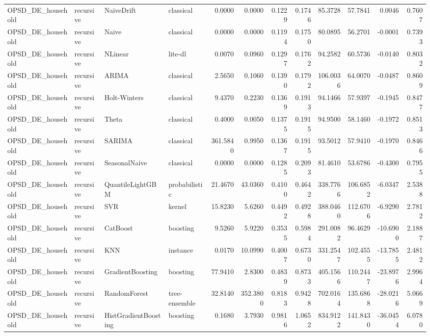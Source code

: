 \begin{tabular}{llllrrrrrrrr}
OPSD_DE_household & recursive & NaiveDrift & classical & 0.0000 & 0.0000 & 0.1229 & 0.1746 & 85.3728 & 57.7841 & 0.0046 & 0.7607 \\
OPSD_DE_household & recursive & Naive & classical & 0.0000 & 0.0000 & 0.1194 & 0.1750 & 80.0895 & 56.2701 & -0.0001 & 0.7393 \\
OPSD_DE_household & recursive & NLinear & lite-dl & 0.0070 & 0.0960 & 0.1297 & 0.1762 & 94.2582 & 60.5736 & -0.0140 & 0.8032 \\
OPSD_DE_household & recursive & ARIMA & classical & 2.5650 & 0.1060 & 0.1390 & 0.1792 & 106.0036 & 64.0070 & -0.0487 & 0.8609 \\
OPSD_DE_household & recursive & Holt-Winters & classical & 9.4370 & 0.2230 & 0.1369 & 0.1913 & 94.1466 & 57.9397 & -0.1945 & 0.8477 \\
OPSD_DE_household & recursive & Theta & classical & 0.4000 & 0.0050 & 0.1375 & 0.1915 & 94.9500 & 58.1460 & -0.1972 & 0.8513 \\
OPSD_DE_household & recursive & SARIMA & classical & 361.5840 & 0.9950 & 0.1367 & 0.1915 & 93.5012 & 57.9410 & -0.1970 & 0.8466 \\
OPSD_DE_household & recursive & SeasonalNaive & classical & 0.0000 & 0.0000 & 0.1285 & 0.2093 & 81.4610 & 53.6786 & -0.4300 & 0.7955 \\
OPSD_DE_household & recursive & QuantileLightGBM & probabilistic & 21.4670 & 43.0360 & 0.4100 & 0.4642 & 338.7766 & 106.6852 & -6.0347 & 2.5388 \\
OPSD_DE_household & recursive & SVR & kernel & 15.8230 & 5.6260 & 0.4492 & 0.4928 & 388.0460 & 112.6706 & -6.9290 & 2.7812 \\
OPSD_DE_household & recursive & CatBoost & boosting & 9.5260 & 5.9220 & 0.3535 & 0.5984 & 291.0082 & 96.4629 & -10.6900 & 2.1887 \\
OPSD_DE_household & recursive & KNN & instance & 0.0170 & 10.0990 & 0.4007 & 0.6730 & 331.2547 & 102.4555 & -13.7855 & 2.4812 \\
OPSD_DE_household & recursive & GradientBoosting & boosting & 77.9410 & 2.8300 & 0.4839 & 0.8733 & 405.1566 & 110.2447 & -23.8976 & 2.9964 \\
OPSD_DE_household & recursive & RandomForest & tree-ensemble & 32.8140 & 352.3800 & 0.8183 & 0.9428 & 702.0164 & 135.6868 & -28.0216 & 5.0669 \\
OPSD_DE_household & recursive & HistGradientBoosting & boosting & 0.1680 & 3.7930 & 0.9816 & 1.0652 & 834.9122 & 141.8430 & -36.0454 & 6.0780 \\

\end{tabular}
